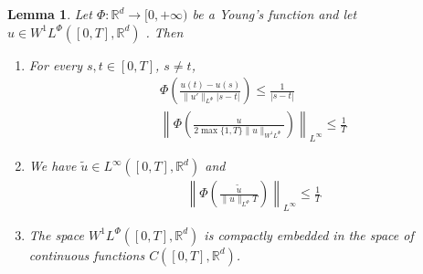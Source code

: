 \documentclass[twoside]{article}
\newtheorem{lem}[thm]{Lemma}
\theoremstyle{remark}
\newcommand{\orlnor}{\|_{L^{\Phi}}}
\newcommand{\lphi}{L^{\Phi}}
\newcommand{\wphi}{W^{1}\lphi}
\newcommand{\sobnor}{\|_{W^{1}\lphi}}
\newcommand{\rr}{\mathbb{R}}
\renewcommand{\leq}{\leqslant}
\begin{document}
\begin{lem}\label{inclusion orlicz} Let $\Phi:\rr^d\to [0,+\infty)$ be a Young's function and let $u\in\wphi([0,T],\rr^d)$ . Then
\begin{enumerate}
\item\label{inclusion orlicz_item1} For every $s,t\in [0,T]$, $s\neq t$,
\begin{align}
 &\Phi\left( \frac{u(t)-u(s)}{\|u'\orlnor |s-t|}\right) \leq
 \frac{1}{|s-t|}\tag{Morrey's inequality}\label{in-sob-cont}
\\
& \left \|\Phi\left( \frac{u}{2\max\{1,T\}\|u\sobnor}\right)\right\|_{L^{\infty}} \leq \frac{1}{T}\tag{Sobolev's inequality}\label{sobolev}
\end{align}
\item We have $\widetilde{u}\in L^{\infty}([0,T],\rr^d)$ and
\begin{align}
& \left\| \Phi\left( \frac{\widetilde{u}}{\|u\orlnor T}\right) \right\|_{L^{\infty}}\leq \frac{1}{T}
\tag{Sobolev-Wirtinger's inequality}\label{wirtinger}
\end{align}
\item\label{it:embeding} The space $\wphi([0,T],\rr^d)$ is compactly embedded in the space of continuous functions $C([0,T],\rr^d)$.
\end{enumerate}
\end{lem}
\end{document}
